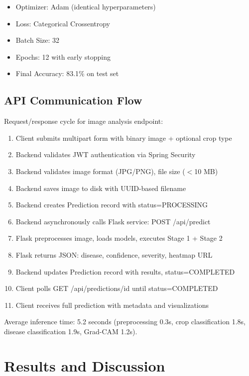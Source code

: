\documentclass[conference]{IEEEtran}
\begin{document}
\begin{itemize}
\item Optimizer: Adam (identical hyperparameters)
\item Loss: Categorical Crossentropy
\item Batch Size: 32
\item Epochs: 12 with early stopping
\item Final Accuracy: 83.1\% on test set
\end{itemize}

\subsection{API Communication Flow}

Request/response cycle for image analysis endpoint:

\begin{enumerate}
\item Client submits multipart form with binary image + optional crop type
\item Backend validates JWT authentication via Spring Security
\item Backend validates image format (JPG/PNG), file size ($<$10 MB)
\item Backend saves image to disk with UUID-based filename
\item Backend creates Prediction record with status=PROCESSING
\item Backend asynchronously calls Flask service: POST /api/predict
\item Flask preprocesses image, loads models, executes Stage 1 + Stage 2
\item Flask returns JSON: disease, confidence, severity, heatmap URL
\item Backend updates Prediction record with results, status=COMPLETED
\item Client polls GET /api/predictions/{id} until status=COMPLETED
\item Client receives full prediction with metadata and visualizations
\end{enumerate}

Average inference time: 5.2 seconds (preprocessing 0.3s, crop classification 1.8s, disease classification 1.9s, Grad-CAM 1.2s).

\section{Results and Discussion}
\end{document}
